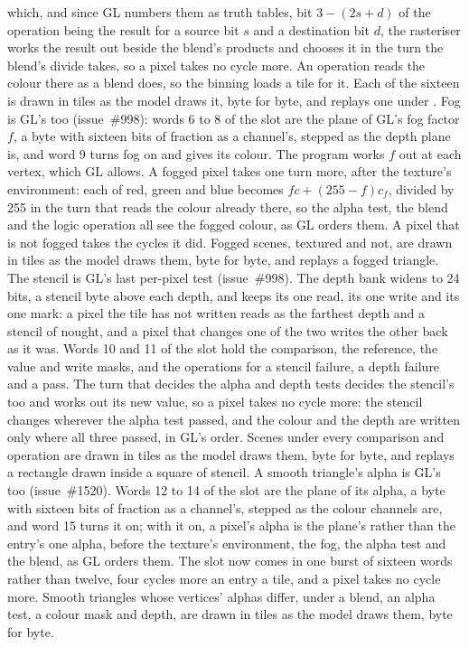 \documentclass[journal,9pt]{IEEEtran}
\begin{document}
which, and since GL numbers them as truth tables, bit $3 - (2s + d)$
of the operation being the result for a source bit $s$ and a
destination bit $d$, the rasteriser works the result out beside the
blend's products and chooses it in the turn the blend's divide takes,
so a pixel takes no cycle more. An operation reads the colour there
as a blend does, so the binning loads a tile for it. Each of the
sixteen is drawn in tiles as the model draws it, byte for byte, and
 replays one under .
Fog is GL's too (issue~\#998): words 6 to 8 of the slot are the plane of
GL's fog factor $f$, a byte with sixteen bits of fraction as a channel's,
stepped as the depth plane is, and word 9 turns fog on and gives its
colour. The program works $f$ out at each vertex, which GL allows. A
fogged pixel takes one turn more, after the texture's environment: each
of red, green and blue becomes $f c + (255 - f) c_f$, divided by 255 in
the turn that reads the colour already there, so the alpha test, the
blend and the logic operation all see the fogged colour, as GL orders
them. A pixel that is not fogged takes the cycles it did. Fogged scenes,
textured and not, are drawn in tiles as the model draws them, byte for
byte, and  replays a fogged triangle.
The stencil is GL's last per-pixel test (issue~\#998). The depth bank
widens to 24 bits, a stencil byte above each depth, and keeps its one
read, its one write and its one mark: a pixel the tile has not written
reads as the farthest depth and a stencil of nought, and a pixel that
changes one of the two writes the other back as it was. Words 10 and 11
of the slot hold the comparison, the reference, the value and write
masks, and the operations for a stencil failure, a depth failure and a
pass. The turn that decides the alpha and depth tests decides the
stencil's too and works out its new value, so a pixel takes no cycle
more: the stencil changes wherever the alpha test passed, and the
colour and the depth are written only where all three passed, in GL's
order. Scenes under every comparison and operation are drawn in tiles
as the model draws them, byte for byte, and
 replays a rectangle drawn inside a square
of stencil.
A smooth triangle's alpha is GL's too (issue~\#1520). Words 12 to 14 of
the slot are the plane of its alpha, a byte with sixteen bits of
fraction as a channel's, stepped as the colour channels are, and word 15
turns it on; with it on, a pixel's alpha is the plane's rather than the
entry's one alpha, before the texture's environment, the fog, the alpha
test and the blend, as GL orders them. The slot now comes in one burst
of sixteen words rather than twelve, four cycles more an entry a tile,
and a pixel takes no cycle more. Smooth triangles whose vertices'
alphas differ, under a blend, an alpha test, a colour mask and depth,
are drawn in tiles as the model draws them, byte for byte.
\end{document}
